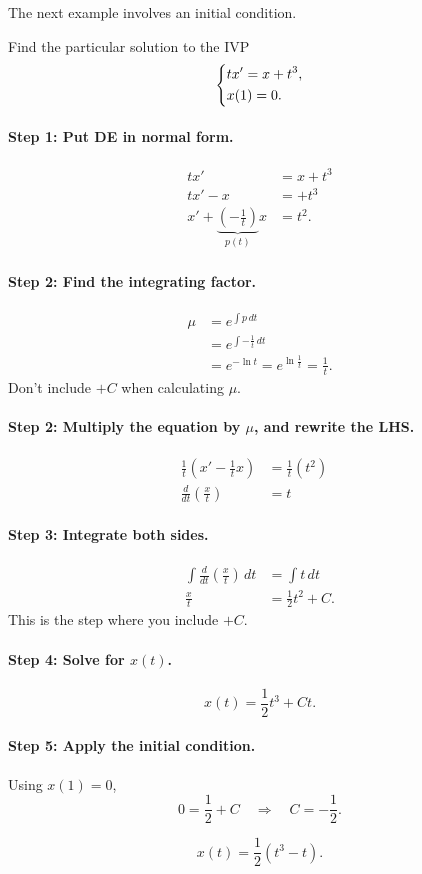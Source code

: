 \documentclass[09pt,letterpaper]{article}
\begin{document}
The next example involves an initial condition. 

\begin{example}[2]{
Find the particular solution to the IVP
\[
\begin{dcases}
tx' = x + t^3,\\
x(1)=0.
\end{dcases}
\]
}
\paragraph{Step 1: Put DE in normal form.}
\begin{align*}
tx' &= x + t^3\\
tx'-x &=  + t^3\\
x'+\underbrace{\left(-\frac{1}{t}\right)}_{p(t)}x &=   t^2.
\end{align*}

\paragraph{Step 2: Find the integrating factor.}
\begin{align*}
    \mu &= e^{\int p\,dt}\\
     &= e^{\int -\frac{1}{t}\,dt}\\
     &= e^{-\ln t}=e^{\ln \frac{1}{t}} = \tfrac{1}{t}.
\end{align*}
Don't include $+C$ when calculating $\mu$. 

\paragraph{Step 2: Multiply the equation by $\mu$, and rewrite the LHS.}
\begin{align*}
   \frac{1}{t}( x'-\frac{1}{t}x) &= \frac{1}{t}(t^2)          & \\
\frac{d}{dt}\!\left(\frac{x}{t}\right) &=t
\end{align*}

\paragraph{Step 3: Integrate both sides.}
\begin{align*}
   \int \frac{d}{dt}\!\left(\frac{x}{t}\right)\,dt &=\int t\,dt\\
\frac{x}{t} &=\frac{1}{2}t^2 + C.
\end{align*}
This is the step where you include $+C$.

\paragraph{Step 4: Solve for $x(t)$.}
\[
x(t) = \frac{1}{2}t^3 + Ct.
\]

\paragraph{Step 5: Apply the initial condition.}
Using $x(1)=0$,
\[
0 = \frac{1}{2} + C
\quad\Rightarrow\quad
C = -\frac{1}{2}.
\]

\[
\boxed{x(t) = \frac{1}{2}(t^3 - t).}
\]
\end{example}
\end{document}
